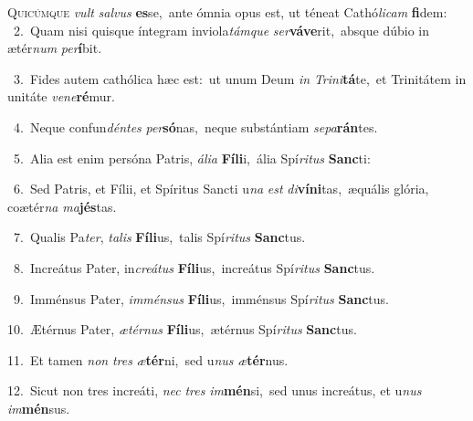 \lettrine{\initial\textcolor{\initialcolor}{Q}}{uicúmque} \textit{vult} \textit{sal}\-\textit{vus} \textbf{es}\-se,~\star ante ómnia opus est, ut téneat Cathó\-\textit{li}\-\textit{cam} \textbf{fi}\-dem:\\
{\numbfont\textcolor{\numbcolor}{~2.}}~Quam nisi quisque íntegram inviola\-\textit{tám}\-\textit{que} \textit{ser}\-\textbf{vá}\textbf{ve}rit,~\star absque dúbio in ætér\textit{num} \textit{per}\-\textbf{í}bit.\par
{\numbfont\textcolor{\numbcolor}{~3.}}~Fides autem cathólica hæc est:~\dagger ut unum Deum \textit{in} \textit{Tri}\-\textit{ni}\textbf{tá}te,~\star et Trinitátem in unitáte \textit{ve}\-\textit{ne}\textbf{ré}mur.\par
{\numbfont\textcolor{\numbcolor}{~4.}}~Neque confun\-\textit{dén}\-\textit{tes} \textit{per}\-\textbf{só}nas,~\star neque substántiam \textit{se}\-\textit{pa}\textbf{rán}tes.\par
{\numbfont\textcolor{\numbcolor}{~5.}}~Alia est enim persóna Patris, \textit{á}\-\textit{li}\textit{a} \textbf{Fí}\-\textbf{li}i,~\star ália Spí\-\textit{ri}\-\textit{tus} \textbf{Sanc}\-ti:\par
{\numbfont\textcolor{\numbcolor}{~6.}}~Sed Patris, et Fílii, et Spíritus Sancti u\textit{na} \textit{est} \textit{di}\-\textbf{ví}\textbf{ni}tas,~\star æquális glória, coætér\textit{na} \textit{ma}\-\textbf{jés}tas.\par
{\numbfont\textcolor{\numbcolor}{~7.}}~Qualis Pa\-\textit{ter}\-, \textit{ta}\-\textit{lis} \textbf{Fí}\-\textbf{li}us,~\star talis Spí\-\textit{ri}\-\textit{tus} \textbf{Sanc}\-tus.\par
{\numbfont\textcolor{\numbcolor}{~8.}}~Increátus Pater, in\-\textit{cre}\-\textit{á}\textit{tus} \textbf{Fí}\-\textbf{li}us,~\star increátus Spí\-\textit{ri}\-\textit{tus} \textbf{Sanc}\-tus.\par
{\numbfont\textcolor{\numbcolor}{~9.}}~Imménsus Pater, \textit{im}\-\textit{mén}\textit{sus} \textbf{Fí}\-\textbf{li}us,~\star imménsus Spí\-\textit{ri}\-\textit{tus} \textbf{Sanc}\-tus.\par
{\numbfont\textcolor{\numbcolor}{10.}}~Ætérnus Pater, \textit{æ}\-\textit{tér}\textit{nus} \textbf{Fí}\-\textbf{li}us,~\star ætérnus Spí\-\textit{ri}\-\textit{tus} \textbf{Sanc}\-tus.\par
{\numbfont\textcolor{\numbcolor}{11.}}~Et tamen \textit{non} \textit{tres} \textit{æ}\-\textbf{tér}ni,~\star sed u\textit{nus} \textit{æ}\-\textbf{tér}nus.\par
{\numbfont\textcolor{\numbcolor}{12.}}~Sicut non tres increáti, \textit{nec} \textit{tres} \textit{im}\-\textbf{mén}si,~\star sed unus increátus, et u\textit{nus} \textit{im}\-\textbf{mén}sus.\par
